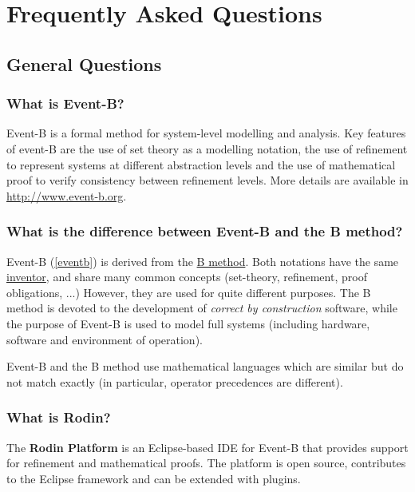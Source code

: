 \chapter{Frequently Asked Questions}
\label{faq}

\section{General Questions}

\subsection{What is Event-B?}

Event-B is a formal method for system-level modelling and analysis. Key features of event-B are the use of set theory as a modelling notation, the use of refinement to represent systems at different abstraction levels and the use of mathematical proof to verify consistency between refinement levels.
More details are available in \url{http://www.event-b.org}.

\subsection{What is the difference between Event-B and the B method?}

Event-B (\ref{eventb}) is derived from the \href{http://en.wikipedia.org/wiki/B-Method}{B method}. Both notations have the same \href{http://en.wikipedia.org/wiki/Jean-Raymond_Abrial}{inventor}, and share many common concepts (set-theory, refinement, proof obligations, ...) However, they are used for quite different purposes. The B method is devoted to the development of \textit{correct by construction} software, while the purpose of Event-B is used to model full systems (including hardware, software and environment of operation).

Event-B and the B method use mathematical languages which are similar but do not match exactly (in particular, operator precedences are different).

\subsection{What is Rodin?}

The \textbf{Rodin Platform} is an Eclipse-based IDE for Event-B that provides support for refinement and mathematical proofs. The platform is open source, contributes to the Eclipse framework and can be extended with plugins.

